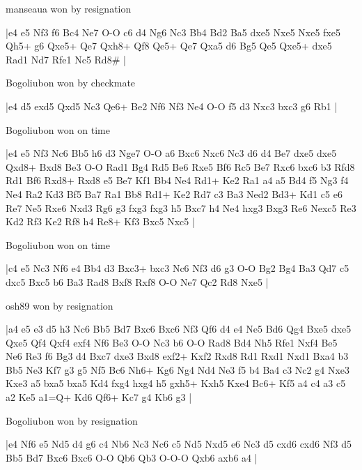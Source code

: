 manseaua won by resignation

\makegametitle
|e4 e5 Nf3 f6 Bc4 Ne7 O-O c6 d4 Ng6 Nc3 Bb4 Bd2 Ba5 dxe5 Nxe5 Nxe5 fxe5 Qh5+ g6 Qxe5+ Qe7 Qxh8+ Qf8 Qe5+ Qe7 Qxa5 d6 Bg5 Qe5 Qxe5+ dxe5 Rad1 Nd7 Rfe1 Nc5 Rd8\#  |

\showboard

Bogoliubon won by checkmate

\makegametitle
|e4 d5 exd5 Qxd5 Nc3 Qe6+ Be2 Nf6 Nf3 Ne4 O-O f5 d3 Nxc3 bxc3 g6 Rb1  |

\showboard

Bogoliubon won on time

\makegametitle
|e4 e5 Nf3 Nc6 Bb5 h6 d3 Nge7 O-O a6 Bxc6 Nxc6 Nc3 d6 d4 Be7 dxe5 dxe5 Qxd8+ Bxd8 Be3 O-O Rad1 Bg4 Rd5 Be6 Rxe5 Bf6 Rc5 Be7 Rxc6 bxc6 b3 Rfd8 Rd1 Bf6 Rxd8+ Rxd8 e5 Be7 Kf1 Bb4 Ne4 Rd1+ Ke2 Ra1 a4 a5 Bd4 f5 Ng3 f4 Ne4 Ra2 Kd3 Bf5 Ba7 Ra1 Bb8 Rd1+ Ke2 Rd7 c3 Ba3 Ned2 Bd3+ Kd1 c5 e6 Re7 Ne5 Rxe6 Nxd3 Rg6 g3 fxg3 fxg3 h5 Bxc7 h4 Ne4 hxg3 Bxg3 Re6 Nexc5 Re3 Kd2 Rf3 Ke2 Rf8 h4 Re8+ Kf3 Bxc5 Nxc5  |

\showboard

Bogoliubon won on time

\makegametitle
|c4 e5 Nc3 Nf6 e4 Bb4 d3 Bxc3+ bxc3 Nc6 Nf3 d6 g3 O-O Bg2 Bg4 Ba3 Qd7 c5 dxc5 Bxc5 b6 Ba3 Rad8 Bxf8 Rxf8 O-O Ne7 Qc2 Rd8 Nxe5  |

\showboard

osh89 won by resignation

\makegametitle
|a4 e5 e3 d5 h3 Nc6 Bb5 Bd7 Bxc6 Bxc6 Nf3 Qf6 d4 e4 Ne5 Bd6 Qg4 Bxe5 dxe5 Qxe5 Qf4 Qxf4 exf4 Nf6 Be3 O-O Nc3 b6 O-O Rad8 Bd4 Nh5 Rfe1 Nxf4 Be5 Ne6 Re3 f6 Bg3 d4 Bxc7 dxe3 Bxd8 exf2+ Kxf2 Rxd8 Rd1 Rxd1 Nxd1 Bxa4 b3 Bb5 Ne3 Kf7 g3 g5 Nf5 Bc6 Nh6+ Kg6 Ng4 Nd4 Ne3 f5 b4 Ba4 c3 Nc2 g4 Nxe3 Kxe3 a5 bxa5 bxa5 Kd4 fxg4 hxg4 h5 gxh5+ Kxh5 Kxe4 Bc6+ Kf5 a4 c4 a3 c5 a2 Ke5 a1=Q+ Kd6 Qf6+ Kc7 g4 Kb6 g3  |

\showboard

Bogoliubon won by resignation

\makegametitle
|e4 Nf6 e5 Nd5 d4 g6 c4 Nb6 Nc3 Nc6 c5 Nd5 Nxd5 e6 Nc3 d5 cxd6 cxd6 Nf3 d5 Bb5 Bd7 Bxc6 Bxc6 O-O Qb6 Qb3 O-O-O Qxb6 axb6 a4  |

